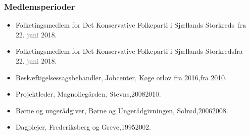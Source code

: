 \documentclass[11pt, a4paper]{awesome-cv}
\begin{document}
\begin{cvletter}
\subsubsection*{Medlemsperioder}
\begin{itemize}
\item Folketingsmedlem for Det Konservative Folkeparti i Sjællands Storkreds fra 22. juni 2018.
\item Folketingsmedlem for Det Konservative Folkeparti i Sjællands Storkredsfra 22. juni 2018.
\end{itemize}
\begin{itemize}
\item Beskæftigelsessagsbehandler, Jobcenter, Køge orlov fra 2016,fra 2010.
\item Projektleder, Magnoliegården, Stevns,20082010.
\item Børne og ungerådgiver, Børne og Ungerådgivningen, Solrød,20062008.
\item Dagplejer, Frederiksberg og Greve,19952002.
\end{itemize}
\end{cvletter}
\end{document}
